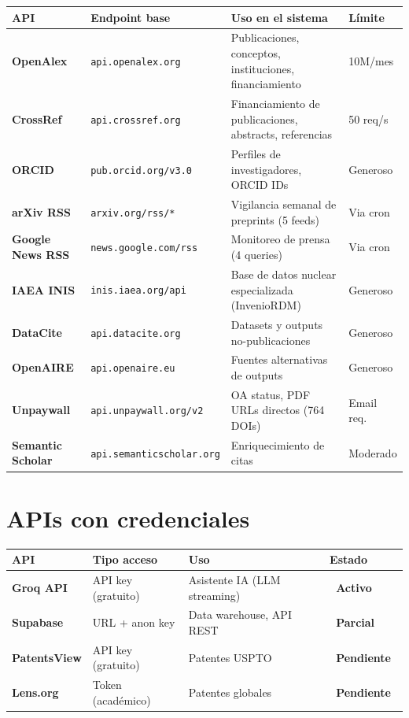 \documentclass[12pt,a4paper]{report}
\newcommand{\api}[1]{{\color{cchengreen}\nolinkurl{#1}}}
\newcommand{\badge}[2]{%
  \colorbox{#1}{\color{white}\small\textbf{\ #2\ }}%
}
\newcommand{\bpending}{\badge{kpigold}{Pendiente}}
\newcommand{\bactive}{\badge{cchengreen}{Activo}}
\newcommand{\bpartial}{\badge{cchengold}{Parcial}}
\begin{document}
\begin{longtable}{L{3.2cm} L{4.8cm} L{4.5cm} L{1.8cm}}
  \toprule
  \textbf{API} & \textbf{Endpoint base} & \textbf{Uso en el sistema} & \textbf{Límite} \\
  \midrule
  \endhead
  \textbf{OpenAlex} & \api{api.openalex.org} & Publicaciones, conceptos, instituciones, financiamiento & 10M/mes \\
  \midrule
  \textbf{CrossRef} & \api{api.crossref.org} & Financiamiento de publicaciones, abstracts, referencias & 50 req/s \\
  \midrule
  \textbf{ORCID} & \api{pub.orcid.org/v3.0} & Perfiles de investigadores, ORCID IDs & Generoso \\
  \midrule
  \textbf{arXiv RSS} & \api{arxiv.org/rss/*} & Vigilancia semanal de preprints (5 feeds) & Via cron \\
  \midrule
  \textbf{Google News RSS} & \api{news.google.com/rss} & Monitoreo de prensa (4 queries) & Via cron \\
  \midrule
  \textbf{IAEA INIS} & \api{inis.iaea.org/api} & Base de datos nuclear especializada (InvenioRDM) & Generoso \\
  \midrule
  \textbf{DataCite} & \api{api.datacite.org} & Datasets y outputs no-publicaciones & Generoso \\
  \midrule
  \textbf{OpenAIRE} & \api{api.openaire.eu} & Fuentes alternativas de outputs & Generoso \\
  \midrule
  \textbf{Unpaywall} & \api{api.unpaywall.org/v2} & OA status, PDF URLs directos (764 DOIs) & Email req. \\
  \midrule
  \textbf{Semantic Scholar} & \api{api.semanticscholar.org} & Enriquecimiento de citas & Moderado \\
  \bottomrule
\end{longtable}

\section{APIs con credenciales}

\begin{longtable}{L{3.5cm} L{3cm} L{4cm} L{3cm}}
  \toprule
  \textbf{API} & \textbf{Tipo acceso} & \textbf{Uso} & \textbf{Estado} \\
  \midrule
  \endhead
  \textbf{Groq API} & API key (gratuito) & Asistente IA (LLM streaming) & \bactive \\
  \midrule
  \textbf{Supabase} & URL + anon key & Data warehouse, API REST & \bpartial \\
  \midrule
  \textbf{PatentsView} & API key (gratuito) & Patentes USPTO & \bpending \\
  \midrule
  \textbf{Lens.org} & Token (académico) & Patentes globales & \bpending \\
  \bottomrule
\end{longtable}
\end{document}
